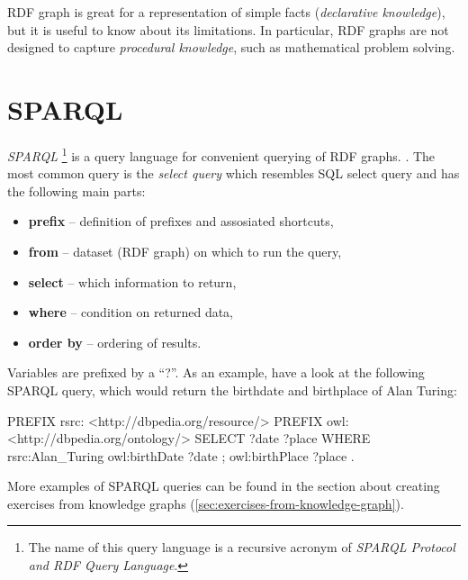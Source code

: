 \documentclass[a4paper, 12pt, twoside]{fithesis2}		%
\renewcommand{\_}{\leavevmode \kern0.07em\vbox{\hrule width0.4em}}
\newcommand{\squarebullet}{\textcolor{black}{\raisebox{0.15em}{\rule{4pt}{4pt}}}}
\newcommand{\emptysquarebullet}{\textcolor{black}{\raisebox{0.10em}{\tiny$\square$}}}
\newenvironment{myItemize}{
  \begin{itemize}[leftmargin=2em,rightmargin=1em,itemsep=\parskip ,parsep=0em,topsep=0em,partopsep=0em]
  \renewcommand{\labelitemi}{\squarebullet}
  \renewcommand{\labelitemii}{\textbullet}
}{
  \end{itemize}
}
\begin{document}
RDF graph is great for a representation of simple facts (\emph{declarative knowledge}),
but it is useful to know about its limitations.
In particular, RDF graphs are not designed to capture \textit{procedural knowledge}, such as mathematical problem solving.



\section{SPARQL}
\label{sec:sparql}

\textit{SPARQL}%
\footnote{The name of this query language is a recursive acronym of \textit{SPARQL Protocol and RDF Query Language}.}
is a query language for convenient querying of RDF graphs. \parencite[][84]{semantic-web}.
The most common query is the \textit{select query} which resembles SQL select query and has the following main parts:
\begin{myItemize}
  \item \textbf{prefix} -- definition of prefixes and assosiated shortcuts,
  \item \textbf{from} -- dataset (RDF graph) on which to run the query,
  \item \textbf{select} -- which information to return,
  \item \textbf{where} -- condition on returned data,
  \item \textbf{order by} -- ordering of results.
\end{myItemize}
Variables are prefixed by a ``?''. As an example, have a look at the following SPARQL query, which would return the birthdate and birthplace of Alan Turing:
\begin{code}
PREFIX rsrc: <http://dbpedia.org/resource/>
PREFIX owl: <http://dbpedia.org/ontology/>
SELECT ?date ?place
WHERE {
  rsrc:Alan_Turing owl:birthDate ?date ;
                     owl:birthPlace ?place .
}
\end{code}

More examples of SPARQL queries can be found in the section about creating exercises from knowledge graphs
(\autoref{sec:exercises-from-knowledge-graph}).

\end{document}
